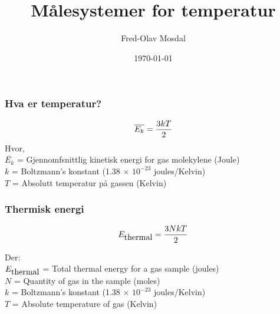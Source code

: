 \documentclass[aspectratio=169,xcolor=dvipsnames]{beamer}
\title[Temperatur]{Målesystemer for temperatur} %
\author[Fred-Olav] {Fred-Olav Mosdal}
\institute[Gand VGS] %
{
    Gand VGS \\
    VG3 Automasjon
}
\date{\today} %
\begin{document}
\begin{frame}
\titlepage
\end{frame}
%
%
\begin{frame}
	\frametitle{Hva er temperatur?}

$$\overline{E_k} = {3 k T \over 2}$$
%
Hvor,\\
%
	$\overline{E_k}$ = Gjennomfsnittlig kinetisk energi for gas molekylene (Joule)\\
%
$k$ = Boltzmann's konstant (1.38 $\times$ $10^{-23}$ joules/Kelvin)\\
%
$T$ = Absolutt temperatur på gassen (Kelvin)\\
%
%
\end{frame}

%
\begin{frame}
	\frametitle{Thermisk energi}
$${E_{\hbox{thermal}}} = {3 N k T \over 2}$$

\vskip 5pt 
Der:\\
${E_{\hbox{thermal}}}$ = Total thermal energy for a gas sample (joules)\\
$N$ = Quantity of gas in the sample (moles)\\
$k$ = Boltzmann's konstant (1.38 $\times$ $10^{-23}$ joules/Kelvin)\\
$T$ = Absolute temperature of gas (Kelvin)\\

\end{frame}
\end{document}
